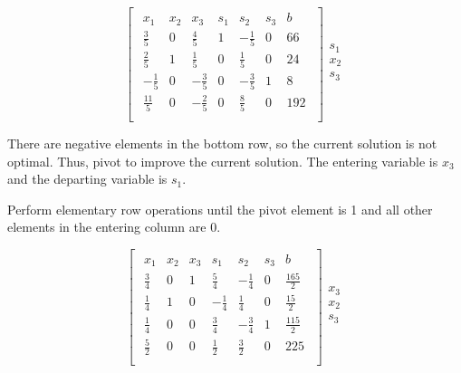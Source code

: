 \documentclass{article}
\begin{document}
\begin{equation*}
\begin{bmatrix}
\begin{array}{cccccc|c}
x_1 & x_2 & x_3 & s_1 & s_2 & s_3 & b \\ \hline
\frac{3}{5} & 0 & \frac{4}{5} & 1 & -\frac{1}{5} & 0 & 66 \\
\frac{2}{5} & 1 & \frac{1}{5} & 0 & \frac{1}{5} & 0 & 24 \\
-\frac{1}{5} & 0 & -\frac{3}{5} & 0 & -\frac{3}{5} & 1 & 8 \\ \hline
\frac{11}{5} & 0 & -\frac{2}{5} & 0 & \frac{8}{5} & 0 & 192 \\
\end{array}
\end{bmatrix}
\begin{array}{c}
\\
s_1 \\
x_2 \\
s_3 \\
\\
\end{array}
\end{equation*}

\begin{flushleft}
There are negative elements in the bottom row, so the current solution is not optimal. Thus, pivot to improve the current solution. The entering variable is $x_3$ and the departing variable is $s_1$.
\end{flushleft}

\begin{flushleft}
Perform elementary row operations until the pivot element is 1 and all other elements in the entering column are 0.
\end{flushleft}

\begin{equation*}
\begin{bmatrix}
\begin{array}{cccccc|c}
x_1 & x_2 & x_3 & s_1 & s_2 & s_3 & b \\ \hline
\frac{3}{4} & 0 & 1 & \frac{5}{4} & -\frac{1}{4} & 0 & \frac{165}{2} \\
\frac{1}{4} & 1 & 0 & -\frac{1}{4} & \frac{1}{4} & 0 & \frac{15}{2} \\
\frac{1}{4} & 0 & 0 & \frac{3}{4} & -\frac{3}{4} & 1 & \frac{115}{2} \\ \hline
\frac{5}{2} & 0 & 0 & \frac{1}{2} & \frac{3}{2} & 0 & 225 \\
\end{array}
\end{bmatrix}
\begin{array}{c}
\\
x_3 \\
x_2 \\
s_3 \\
\\
\end{array}
\end{equation*}
\end{document}
